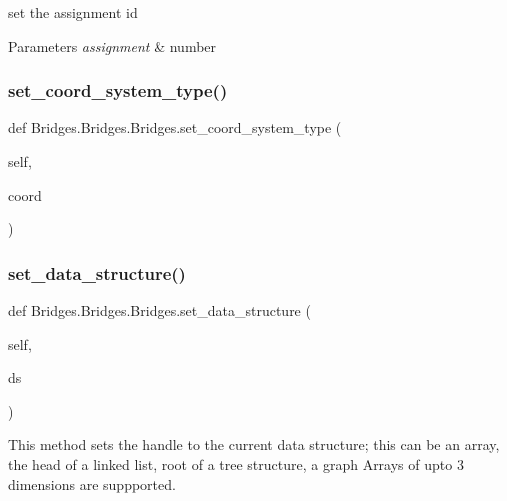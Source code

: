 set the assignment id 


\begin{DoxyParams}{Parameters}
{\em assignment} & number \\
\hline
\end{DoxyParams}
\mbox{\label{class_bridges_1_1_bridges_1_1_bridges_ae1fa0dd1d4c8070d7746a5fdbf7cd4f0}} 
\subsubsection{\texorpdfstring{set\+\_\+coord\+\_\+system\+\_\+type()}{set\_coord\_system\_type()}}
{\footnotesize\ttfamily def Bridges.\+Bridges.\+Bridges.\+set\+\_\+coord\+\_\+system\+\_\+type (\begin{DoxyParamCaption}\item[{}]{self,  }\item[{}]{coord }\end{DoxyParamCaption})}

\mbox{\label{class_bridges_1_1_bridges_1_1_bridges_a2eb292b292544a6d8ff6bb336580f133}} 
\subsubsection{\texorpdfstring{set\+\_\+data\+\_\+structure()}{set\_data\_structure()}}
{\footnotesize\ttfamily def Bridges.\+Bridges.\+Bridges.\+set\+\_\+data\+\_\+structure (\begin{DoxyParamCaption}\item[{}]{self,  }\item[{}]{ds }\end{DoxyParamCaption})}



This method sets the handle to the current data structure; this can be an array, the head of a linked list, root of a tree structure, a graph Arrays of upto 3 dimensions are suppported. 

